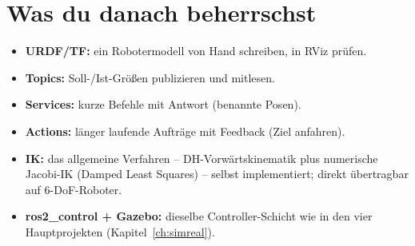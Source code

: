 \section{Was du danach beherrschst}
\begin{itemize}
\item \textbf{URDF/TF:} ein Robotermodell von Hand schreiben, in RViz prüfen.
\item \textbf{Topics:} Soll-/Ist-Größen publizieren und mitlesen.
\item \textbf{Services:} kurze Befehle mit Antwort (benannte Posen).
\item \textbf{Actions:} länger laufende Aufträge mit Feedback (Ziel anfahren).
\item \textbf{IK:} das allgemeine Verfahren -- DH-Vorwärtskinematik plus
  numerische Jacobi-IK (Damped Least Squares) -- selbst implementiert; direkt
  übertragbar auf 6-DoF-Roboter.
\item \textbf{ros2\_control + Gazebo:} dieselbe Controller-Schicht wie in den
  vier Hauptprojekten (Kapitel~\ref{ch:simreal}).
\end{itemize}

